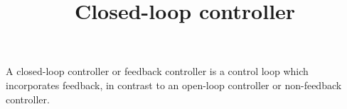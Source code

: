 \documentclass[a4paper]{article}
\title{Closed-loop controller}
\date{}
\begin{document}
\maketitle
    A closed-loop controller or feedback controller is a control loop which incorporates feedback, in contrast to an open-loop controller or non-feedback controller.  
\end{document}
